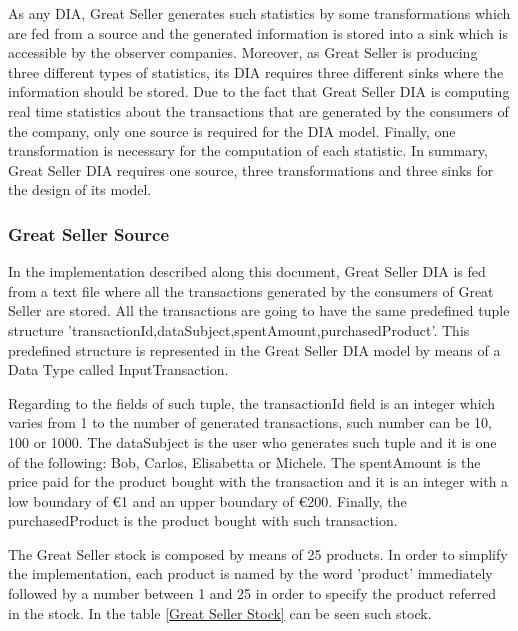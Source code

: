 As any DIA, Great Seller generates such statistics by some transformations which are fed from a source and the generated information is stored into a sink which is accessible by the observer companies. Moreover, as Great Seller is producing three different types of statistics, its DIA requires three different sinks where the information should be stored. Due to the fact that Great Seller DIA is computing real time statistics about the transactions that are generated by the consumers of the company, only one source is required for the DIA model. Finally, one transformation is necessary for the computation of each statistic. In summary, Great Seller DIA requires one source, three transformations and three sinks for the design of its model.

\subsubsection{Great Seller Source}
In the implementation described along this document, Great Seller DIA is fed from a text file where all the transactions generated by the consumers of Great Seller are stored. All the transactions are going to have the same predefined tuple structure 'transactionId,dataSubject,spentAmount,purchasedProduct'. This predefined structure is represented in the Great Seller DIA model by means of a Data Type called InputTransaction.

Regarding to the fields of such tuple, the transactionId field is an integer which varies from 1 to the number of generated transactions, such number can be 10, 100 or 1000. The dataSubject is the user who generates such tuple and it is one of the following: Bob, Carlos, Elisabetta or Michele. The spentAmount is the price paid for the product bought with the transaction and it is an integer with a low boundary of \euro{1} and an upper boundary of \euro{200}. Finally, the purchasedProduct is the product bought with such transaction.

The Great Seller stock is composed by means of 25 products. In order to simplify the implementation, each product is named by the word 'product' immediately followed by a number between 1 and 25 in order to specify the product referred in the stock. In the table \ref{Great Seller Stock} can be seen such stock.

